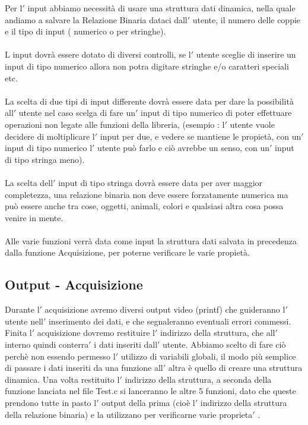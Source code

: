 \documentclass[11pt, a4paper, titlepage, block]{article}
\begin{document}
	
	Per l$'$ input abbiamo necessit\`a di usare una struttura dati dinamica, nella quale andiamo a salvare la Relazione Binaria dataci dall$'$ utente, il numero delle coppie e il tipo di input ( numerico o per stringhe).\\
	\\
	L input dovr\`a essere dotato di diversi controlli, se l$'$ utente sceglie di inserire un input di tipo numerico allora non potra digitare stringhe e/o caratteri speciali etc.\\
	\\
	La scelta di due tipi di input differente dovr\`a essere data per dare la possibilit\`a all$'$ utente nel caso scelga di fare un$'$ input di tipo numerico di poter effettuare operazioni non legate alle funzioni della libreria, (esempio : l$'$ utente vuole decidere di moltiplicare l$'$ input per due, e vedere se mantiene le propiet\`a, con un$'$ input di tipo numerico l$'$ utente può farlo e ciò avrebbe un senso, con un$'$ input di tipo stringa meno).\\
	\\
	La scelta dell$'$ input di tipo stringa dovr\`a essere data per aver maggior completezza, una relazione binaria non deve essere forzatamente numerica ma può essere anche tra cose, oggetti, animali, colori e qualsiasi altra cosa possa venire in mente.\\
	\\
	Alle varie funzioni verr\`a data come input la struttura dati salvata in precedenza dalla funzione Acquisizione, per poterne verificare le varie propiet\`a.\\
	
	
	
	
	\newpage        
	\subsection{Output - Acquisizione}
	Durante l$'$ acquisizione avremo diversi output video (printf) che guideranno l$'$ utente nell$'$ inserimento dei dati, e che segnaleranno eventuali errori commessi.
	Finita l$'$ acquisizione dovremo restituire l$'$ indirizzo della struttura, che all$'$ interno quindi conterra$'$  i dati inseriti dall$'$ utente. Abbiamo scelto di fare ciò perch\`e non essendo permesso l$'$ utilizzo di variabili globali, il modo più semplice di passare i dati inseriti da una funzione all$'$ altra \`e  quello di creare una struttura dinamica.
	Una volta restituito l$'$ indirizzo della struttura, a seconda della funzione lanciata nel file Test.c si lanceranno le altre 5 funzioni, dato che queste prendono tutte in pasto l$'$ output della prima (cio\`e l$'$ indirizzo della struttura della relazione binaria) e la utilizzano per verificarne varie proprieta$'$ .\\
	\\
\end{document}
